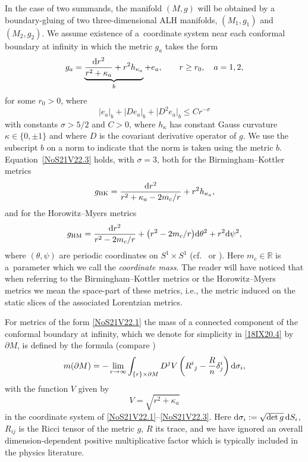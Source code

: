 \documentclass[pdftex]{sigma}
\numberwithin{equation}{section}
\newcommand{\mygb}{\red{b}}
\newcommand{\red}[1]{{\color{red}#1}}
\newcommand{\R}{\mathbb R}
\renewcommand{\red}[1]{#1}
\begin{document}
In the case of two summands, the manifold $(M,g)$ will be obtained by a boundary-gluing of two three-dimensional ALH manifolds, $(M_1,g_1)$ and $(M_2,g_2)$. We assume existence of a~coordinate system near each conformal boundary at infinity in which the metric $g_a$ takes the form
\begin{gather}\label{NoS21V22.1}
 g_a = \underbrace{
 \frac{{\rm d}r^2}{r^2+\kappa_a} + r^2 h_{\kappa_a}
 }_{\mygb} + e_a ,
 \qquad
 r\ge r_0, \quad
 a=1,2,
\end{gather}
for some $r_0>0$, where
\begin{equation}\label{NoS21V22.3}
 |e_a|_{\mygb}
 + |D e_a|_{\mygb}
 + \big|D^2 e_a\big|_{\mygb}
 \le C r^{-\sigma}
\end{equation}
with constants $\sigma>5/2$ and $C>0$, where $h_\kappa$ has constant Gauss curvature $\kappa \in \{0,\pm1\}$
and where $D$ is the covariant derivative operator of $g$.
We use the subscript $\mygb$ on a norm to indicate that the norm is taken using the metric $\mygb$.
Equation~\eqref{NoS21V22.3} holds, with $\sigma = 3$, both for the Birmingham--Kottler metrics
\begin{equation}\label{21XI22.p1}
 g_{\text{BK}} = \frac{{\rm d}r^2}{r^2+\kappa_a - 2m_c/r} + r^2 h_{\kappa_a},
\end{equation}
and for the Horowitz--Myers metrics
\begin{equation}\label{21XI22.p2}
 g_{\text{HM}}
 = \frac{{\rm d}r^2}{r^2 - 2m_c/r} + \big(r^2 - 2m_c/r\big) {\rm d}\theta^2 + r^2 {\rm d}\psi^2,
\end{equation}
%
where $(\theta,\psi)$ are periodic coordinates on $S^1\times S^1$ (cf.~\cite{Birmingham,HorowitzMyers,Kottler} or \cite{ChruscielBHBook}). Here $m_c\in \R$ is a~parameter which we call the \emph{coordinate mass}.
The reader will have noticed that when referring to the Birmingham--Kottler metrics or the Horowitz--Myers metrics we mean the space-part of these metrics, i.e., the metric induced on the static slices of the associated Lorentzian metrics.

For metrics of the form \eqref{NoS21V22.1} the mass of a connected component of the conformal boundary at infinity, which we denote for simplicity in \eqref{18IX20.4} by $\partial M$, is defined
 by the formula
 \cite{HerzlichRicciMass} (compare \cite[equation~(IV.40)]{BCHKK})
 \begin{gather}
 m( \partial M)
 =
 - \lim_{r\rightarrow \infty}\int_{\{r\} \times \partial M} D^j V
 \left( R{}^i{}_j - \frac {R{}}{n}\delta^i_j\right) {\rm d}\sigma_i,
 \label{18IX20.4}
 \end{gather}
 with the function $V$ given by
 \begin{equation}\label{1XI22.11}
 V =\sqrt{r^2 + \kappa_a}
 \end{equation}
 in the coordinate system of \eqref{NoS21V22.1}--\eqref{NoS21V22.3}.
 Here
 ${\rm d}\sigma_i := \sqrt{\det g} \,{\rm d}S_i$,
 $R_{ij}$ is the Ricci tensor of the metric $g$, $R$ its trace, and
 we have ignored an overall dimension-dependent positive multiplicative factor which is typically included in the physics literature.
\end{document}
